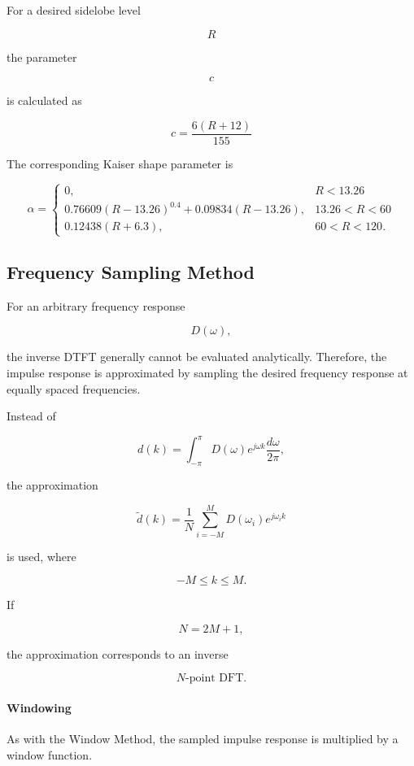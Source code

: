 For a desired sidelobe level

\[
R
\]

the parameter

\[
c
\]

is calculated as

\[
\boxed{
c
=
\frac{6(R+12)}{155}
}
\]

The corresponding Kaiser shape parameter is

\[
\alpha
=
\begin{cases}
0,
&
R<13.26
\\[1ex]
0.76609(R-13.26)^{0.4}
+
0.09834(R-13.26),
&
13.26<R<60
\\[1ex]
0.12438(R+6.3),
&
60<R<120.
\end{cases}
\]

\subsection{Frequency Sampling Method}

For an arbitrary frequency response

\[
D(\omega),
\]

the inverse DTFT generally cannot be evaluated analytically. Therefore,
the impulse response is approximated by sampling the desired frequency
response at equally spaced frequencies.

Instead of

\[
d(k)
=
\int_{-\pi}^{\pi}
D(\omega)e^{j\omega k}
\frac{d\omega}{2\pi},
\]

the approximation

\[
\boxed{
\tilde d(k)
=
\frac1N
\sum_{i=-M}^{M}
D(\omega_i)
e^{j\omega_i k}
}
\]

is used, where

\[
-M\le k\le M.
\]

If

\[
N=2M+1,
\]

the approximation corresponds to an inverse

\[
N\text{-point DFT}.
\]


\paragraph{Windowing}

As with the Window Method, the sampled impulse response is multiplied by
a window function.

